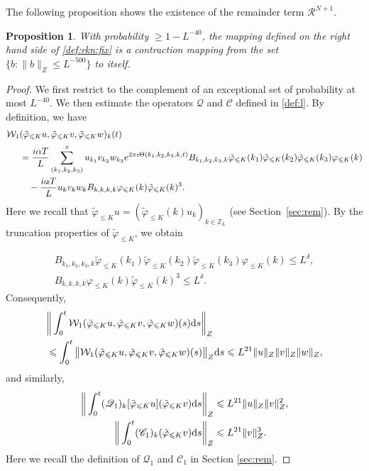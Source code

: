 \documentclass[UTF-8,reqno]{amsart}
\numberwithin{equation}{section}
\newtheorem{proposition}[theorem]{Proposition}
\theoremstyle{definition}
\def\dif{{\mathord{{\rm d}}}}
\def\geq{\geqslant}
\def\leq{\leqslant}
\def\dif{{\mathord{{\rm d}}}}
\def\geq{\geqslant}
\def\leq{\leqslant}
\begin{document}
The following proposition shows the existence of the remainder term $\mathcal{R}^{N+1}$.

\begin{proposition}\label{prop:rnsmall}
    With probability $\geq 1-L^{-40}$,  the mapping defined on the right hand  side of \eqref{def:rkn:fix} is a contraction mapping from the set $\{b : \|b\|_{ Z} \leq  L^{-500}\}$ to itself.
\end{proposition}
\begin{proof}
We first restrict to the complement of an exceptional set of probability at most $L^{-40}$.  
We then estimate the operators $\mathscr{Q}$ and $\mathscr{C}$ defined in \eqref{def:l}. By definition, we have
\begin{align}
  \mathcal{W}_1&(\tilde\varphi_{\leq K}u,\tilde\varphi_{\leq K}v,\tilde\varphi_{\leq K}w)_k(t)\notag\\
  &=\frac{i\alpha T}{L}  \sum\limits_{(k_1,k_2, k_{3})}^{\times} u_{k_1}{v_{k_2}}  w_{k_3} e^{2\pi i \Theta(k_1,k_2,k_3,k,t)}B_{k_1,k_2,k_3,k}\tilde\varphi_{\leq K}(k_1)\tilde\varphi_{\leq K}(k_2)\tilde\varphi_{\leq K}(k_3)\varphi_{\leq K}(k)\notag\\
&\quad -\frac{i\alpha T}{L}u_{k}{v_{k}}w_{k}B_{k,k,k,k}\varphi_{\leq K}(k)\tilde\varphi_{\leq K}(k)^3\notag.    
\end{align}
Here we recall that $\tilde\varphi_{\leq K}u=(\tilde\varphi_{\leq K}(k)u_k)_{k\in\mathbb{Z}_L}$ (see Section~\ref{sec:rem}). By the truncation properties of $\tilde\varphi_{\leq K}$, we obtain
 
\begin{align*}
B_{k_1,k_2,k_3,k}\tilde\varphi_{\leq K}(k_1)\tilde\varphi_{\leq K}(k_2)\tilde\varphi_{\leq K}(k_3)\varphi_{\leq K}(k)\leq L^\delta,\\
B_{k,k,k,k}\varphi_{\leq K}(k)\tilde\varphi_{\leq K}(k)^3\leq L^\delta.
\end{align*}
Consequently,
\begin{align}\label{bd:est:w1}
  &\bigg\| \int_0^t\mathcal{W}_1(\tilde\varphi_{\leq K}u,\tilde\varphi_{\leq K}v,\tilde\varphi_{\leq K}w)(s)\dif s\bigg\|_{Z}\notag\\
  & \leq  \int_0^t\big\|\mathcal{W}_1(\tilde\varphi_{\leq K}u,\tilde\varphi_{\leq K}v,\tilde\varphi_{\leq K}w)(s)\big\|_{Z}\dif s\leq L^{21}\|u\|_Z\|v\|_Z\|w\|_Z,
   \end{align}
   and similarly,
   \begin{align*}
    \bigg\| \int_0^t(\mathscr{Q}_1)_k[\tilde\varphi_{\leq K}u](\tilde\varphi_{\leq K}v)\dif s\bigg\|_{Z}&\leq L^{21}\|u\|_Z\|v\|_Z^2,\\
    \bigg\| \int_0^t  (\mathscr{C}_1)_k(\tilde\varphi_{\leq K}v)\dif s\bigg\|_{Z}&\leq L^{21}\|v\|_Z^3.
\end{align*}
Here we recall the definition of $\mathscr{Q}_1$ and $\mathscr{C}_1$ in Section \ref{sec:rem}.


\end{proof}
\end{document}
